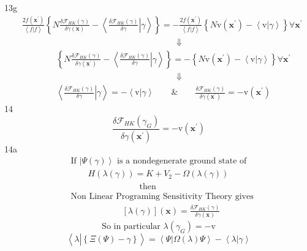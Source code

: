 \documentclass[aps,preprint]{revtex4}%
\begin{document}
13g%
\begin{align*}
&  \left.  \frac{2f\left(  \mathbf{x}^{\prime}\right)  }{\left\langle
f|f\right\rangle }\left\{  N\frac{\delta\mathcal{F}_{HK}\left(  \gamma\right)
}{\delta\gamma\left(  \mathbf{x}\right)  }-\left\langle \left.  \frac
{\delta\mathcal{F}_{HK}\left(  \gamma\right)  }{\delta\gamma}\right\vert
\gamma\right\rangle \right\}  =-\frac{2f\left(  \mathbf{x}^{\prime}\right)
}{\left\langle f|f\right\rangle }\left\{  N\mathrm{v}\left(  \mathbf{x}%
^{\prime}\right)  -\left\langle \left.  \mathrm{v}\right\vert \gamma
\right\rangle \right\}  \forall\mathbf{x}^{\prime}\right.  \\
&  \qquad\qquad\qquad\qquad\qquad\qquad\qquad\qquad\qquad\left.
\Downarrow\right.  \\
&  \qquad\qquad\left.  \left\{  N\frac{\delta\mathcal{F}_{HK}\left(
\gamma\right)  }{\delta\gamma\left(  \mathbf{x}^{\prime}\right)
}-\left\langle \left.  \frac{\delta\mathcal{F}_{HK}\left(  \gamma\right)
}{\delta\gamma}\right\vert \gamma\right\rangle \right\}  =-\left\{
N\mathrm{v}\left(  \mathbf{x}^{\prime}\right)  -\left\langle \left.
\mathrm{v}\right\vert \gamma\right\rangle \right\}  \forall\mathbf{x}^{\prime
}\right.  \\
&  \qquad\qquad\qquad\qquad\qquad\qquad\qquad\qquad\qquad\left.
\Downarrow\right.  \\
&  \qquad\qquad\left.  \left\langle \left.  \frac{\delta\mathcal{F}%
_{HK}\left(  \gamma\right)  }{\delta\gamma}\right\vert \gamma\right\rangle
=-\left\langle \left.  \mathrm{v}\right\vert \gamma\right\rangle
\qquad\&\qquad\frac{\delta\mathcal{F}_{HK}\left(  \gamma\right)  }%
{\delta\gamma\left(  \mathbf{x}^{\prime}\right)  }=-\mathrm{v}\left(
\mathbf{x}^{\prime}\right)  \right.
\end{align*}
14%
\[
\frac{\delta\mathcal{F}_{HK}\left(  \gamma_{G}\right)  }{\delta\gamma\left(
\mathbf{x}^{\prime}\right)  }=-\mathrm{v}\left(  \mathbf{x}^{\prime}\right)
\]
14a%
\begin{align*}
&  \text{If }\left\vert \Psi\left(  \gamma\right)  \right\rangle \text{ is a
nondegenerate ground state of }\\
&  \qquad\left.  H\left(  \lambda\left(  \gamma\right)  \right)
=K+V_{2}-\Omega\left(  \lambda\left(  \gamma\right)  \right)  \right.  \\
&  \qquad\qquad\qquad\qquad\text{then}\\
&  \text{Non Linear Programing Sensitivity Theory gives}\\
&  \qquad\qquad\qquad\left.  \left[  \lambda\left(  \gamma\right)  \right]
\left(  \mathbf{x}\right)  =\frac{\delta\mathcal{F}_{HK}\left(  \gamma\right)
}{\delta\gamma\left(  \mathbf{x}\right)  }\right.
\end{align*}%
\[
\text{So in particular }\left.  \lambda\left(  \gamma_{G}\right)
=-\mathrm{v}\right.
\]%
\[
\left\langle \lambda\left\vert \overset{}{\left\{  \Xi\left(  \Psi\right)
-\gamma\right\}  }\right.  \right\rangle =\left\langle \left.  \Psi\right\vert
\Omega\left(  \lambda\right)  \Psi\right\rangle -\left\langle \lambda
\left\vert \gamma\right.  \right\rangle
\]
\end{document}
